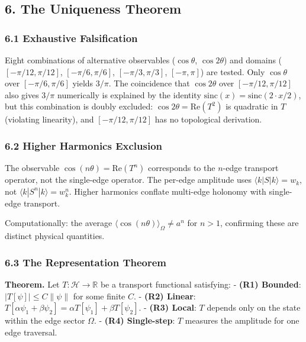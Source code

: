 \documentclass[
]{article}
\begin{document}
\hypertarget{the-uniqueness-theorem}{%
\subsection{6. The Uniqueness Theorem}\label{the-uniqueness-theorem}}

\hypertarget{exhaustive-falsification}{%
\subsubsection{6.1 Exhaustive
Falsification}\label{exhaustive-falsification}}

Eight combinations of alternative observables (\(\cos\theta\),
\(\cos 2\theta\)) and domains (\([-\pi/12, \pi/12]\),
\([-\pi/6, \pi/6]\), \([-\pi/3, \pi/3]\), \([-\pi, \pi]\)) are tested.
Only \(\cos\theta\) over \([-\pi/6, \pi/6]\) yields \(3/\pi\). The
coincidence that \(\cos 2\theta\) over \([-\pi/12, \pi/12]\) also gives
\(3/\pi\) numerically is explained by the identity
\(\mathrm{sinc}(x) = \mathrm{sinc}(2 \cdot x/2)\), but this combination
is doubly excluded: \(\cos 2\theta = \mathrm{Re}(T^2)\) is quadratic in
\(T\) (violating linearity), and \([-\pi/12, \pi/12]\) has no
topological derivation.

\hypertarget{higher-harmonics-exclusion}{%
\subsubsection{6.2 Higher Harmonics
Exclusion}\label{higher-harmonics-exclusion}}

The observable \(\cos(n\theta) = \mathrm{Re}(T^n)\) corresponds to the
\(n\)-edge transport operator, not the single-edge operator. The
per-edge amplitude uses \(\langle k | S | k \rangle = w_k\), not
\(\langle k | S^n | k \rangle = w_k^n\). Higher harmonics conflate
multi-edge holonomy with single-edge transport.

Computationally: the average
\(\langle \cos(n\theta) \rangle_\Omega \neq a^n\) for \(n > 1\),
confirming these are distinct physical quantities.

\hypertarget{the-representation-theorem}{%
\subsubsection{6.3 The Representation
Theorem}\label{the-representation-theorem}}

\textbf{Theorem.} Let \(T: \mathcal{H} \to \mathbb{R}\) be a transport
functional satisfying: - \textbf{(R1) Bounded}:
\(|T[\psi]| \leq C \|\psi\|\) for some finite \(C\). - \textbf{(R2)
Linear}:
\(T[\alpha\psi_1 + \beta\psi_2] = \alpha T[\psi_1] + \beta T[\psi_2]\).
- \textbf{(R3) Local}: \(T\) depends only on the state within the edge
sector \(\Omega\). - \textbf{(R4) Single-step}: \(T\) measures the
amplitude for one edge traversal.
\end{document}
